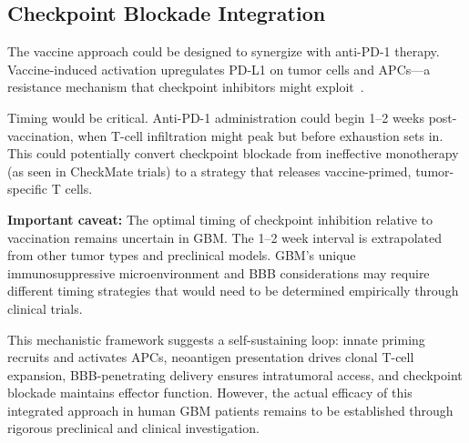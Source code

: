 \documentclass[12pt]{article}
\begin{document}
\subsection{Checkpoint Blockade Integration}
The vaccine approach could be designed to synergize with anti-PD-1 therapy. Vaccine-induced activation upregulates PD-L1 on tumor cells and APCs---a resistance mechanism that checkpoint inhibitors might exploit~\citep{chen2024}.

Timing would be critical. Anti-PD-1 administration could begin 1--2 weeks post-vaccination, when T-cell infiltration might peak but before exhaustion sets in. This could potentially convert checkpoint blockade from ineffective monotherapy (as seen in CheckMate trials) to a strategy that releases vaccine-primed, tumor-specific T cells.

\textbf{Important caveat:} The optimal timing of checkpoint inhibition relative to vaccination remains uncertain in GBM. The 1--2 week interval is extrapolated from other tumor types and preclinical models. GBM's unique immunosuppressive microenvironment and BBB considerations may require different timing strategies that would need to be determined empirically through clinical trials.

This mechanistic framework suggests a self-sustaining loop: innate priming recruits and activates APCs, neoantigen presentation drives clonal T-cell expansion, BBB-penetrating delivery ensures intratumoral access, and checkpoint blockade maintains effector function. However, the actual efficacy of this integrated approach in human GBM patients remains to be established through rigorous preclinical and clinical investigation.
\end{document}
